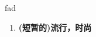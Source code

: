 
\begin{frame}
{\huge fad}
\begin{center}
\begin{enumerate}\Large
  \item \textbf{(短暂的)流行，时尚}
\end{enumerate}
\end{center}
\end{frame}
